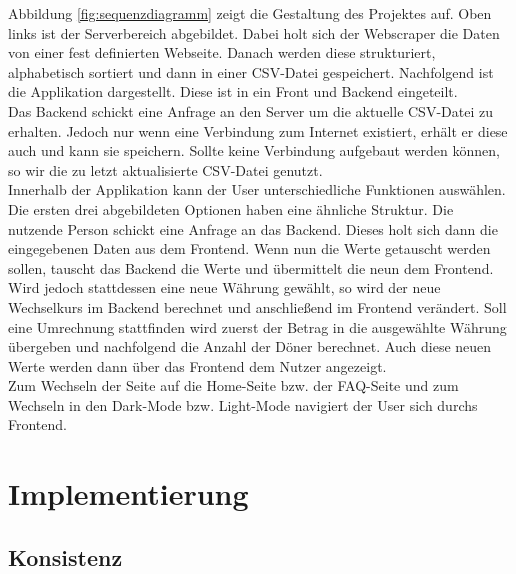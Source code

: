 \documentclass[conference]{IEEEtran}
\begin{document}
\noindent
Abbildung \ref{fig:sequenzdiagramm} zeigt die Gestaltung des Projektes auf. Oben links ist der Serverbereich abgebildet. Dabei holt sich der Webscraper die Daten von einer fest definierten Webseite. Danach werden diese strukturiert, alphabetisch sortiert und dann in einer CSV-Datei gespeichert. Nachfolgend ist die Applikation dargestellt. Diese ist in ein Front und Backend eingeteilt. \\
Das Backend schickt eine Anfrage an den Server um die aktuelle CSV-Datei zu erhalten. Jedoch nur wenn eine Verbindung zum Internet existiert, erhält er diese auch und kann sie speichern. Sollte keine Verbindung aufgebaut werden können, so wir die zu letzt aktualisierte CSV-Datei genutzt. \\
Innerhalb der Applikation kann der User unterschiedliche Funktionen auswählen. Die ersten drei abgebildeten Optionen haben eine ähnliche Struktur. Die nutzende Person schickt eine Anfrage an das Backend. Dieses holt sich dann die eingegebenen Daten aus dem Frontend. Wenn nun die Werte getauscht werden sollen, tauscht das Backend die Werte und übermittelt die neun dem Frontend. Wird jedoch stattdessen eine neue Währung gewählt, so wird der neue Wechselkurs im Backend berechnet und anschließend im Frontend verändert. Soll eine Umrechnung stattfinden wird zuerst der Betrag in die ausgewählte Währung übergeben und nachfolgend die Anzahl der Döner berechnet. Auch diese neuen Werte werden dann über das Frontend dem Nutzer angezeigt. \\
Zum Wechseln der Seite auf die Home-Seite bzw. der FAQ-Seite und zum Wechseln in den Dark-Mode bzw. Light-Mode navigiert der User sich durchs Frontend.

\section{Implementierung}

\subsection{Konsistenz}
\end{document}
